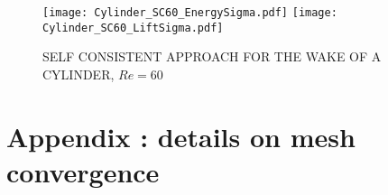 \documentclass{elsarticle}
\begin{document}
\begin{figure}
\begin{center}
\texttt{[image: Cylinder\_SC60\_EnergySigma.pdf]}
\texttt{[image: Cylinder\_SC60\_LiftSigma.pdf]}
\end{center}
\caption{SELF CONSISTENT APPROACH FOR THE WAKE OF A CYLINDER, $Re = 60$}
\label{fig:SC60}
\end{figure}






\appendix

\section{Appendix : details on mesh convergence}
\end{document}
